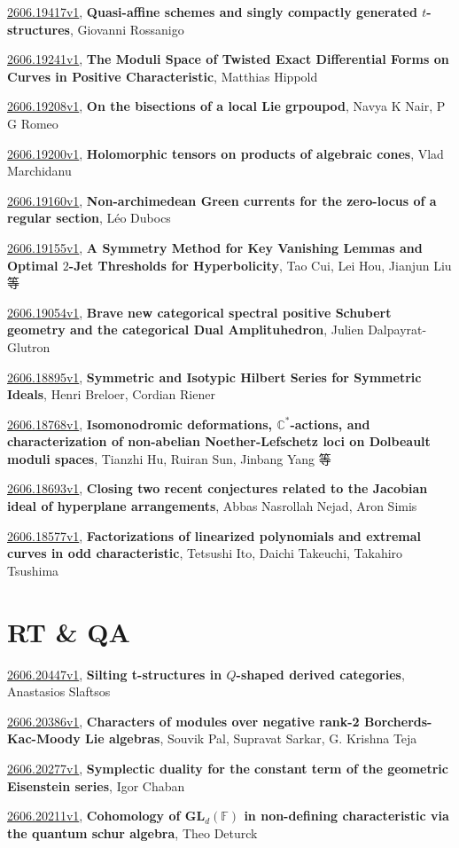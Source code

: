 \documentclass[9pt, a4paper]{article}
\theoremstyle{plain}
\theoremstyle{definition}
\theoremstyle{remark}
\newcommand{\arxiv}[3]{\href{https://arxiv.org/abs/#1}{#1}, \textbf{\textcolor{arxivblue}{#2}}, #3}
\begin{document}
\arxiv{2606.19417v1}{Quasi-affine schemes and singly compactly generated $t$-structures}{Giovanni Rossanigo}

\arxiv{2606.19241v1}{The Moduli Space of Twisted Exact Differential Forms on Curves in Positive Characteristic}{Matthias Hippold}

\arxiv{2606.19208v1}{On the bisections of a local Lie grpoupod}{Navya K Nair, P G Romeo}

\arxiv{2606.19200v1}{Holomorphic tensors on products of algebraic cones}{Vlad Marchidanu}

\arxiv{2606.19160v1}{Non-archimedean Green currents for the zero-locus of a regular section}{Léo Dubocs}

\arxiv{2606.19155v1}{A Symmetry Method for Key Vanishing Lemmas and Optimal $2$-Jet Thresholds for Hyperbolicity}{Tao Cui, Lei Hou, Jianjun Liu 等}

\arxiv{2606.19054v1}{Brave new categorical spectral positive Schubert geometry and the categorical Dual Amplituhedron}{Julien Dalpayrat-Glutron}

\arxiv{2606.18895v1}{Symmetric and Isotypic Hilbert Series for Symmetric Ideals}{Henri Breloer, Cordian Riener}

\arxiv{2606.18768v1}{Isomonodromic deformations, $\mathbb C^*$-actions, and characterization of non-abelian Noether-Lefschetz loci on Dolbeault moduli spaces}{Tianzhi Hu, Ruiran Sun, Jinbang Yang 等}

\arxiv{2606.18693v1}{Closing two recent conjectures related to the Jacobian ideal of hyperplane arrangements}{Abbas Nasrollah Nejad, Aron Simis}

\arxiv{2606.18577v1}{Factorizations of linearized polynomials and extremal curves in odd characteristic}{Tetsushi Ito, Daichi Takeuchi, Takahiro Tsushima}


\section{RT \& QA}
\arxiv{2606.20447v1}{Silting t-structures in $Q$-shaped derived categories}{Anastasios Slaftsos}

\arxiv{2606.20386v1}{Characters of modules over negative rank-2 Borcherds-Kac-Moody Lie algebras}{Souvik Pal, Supravat Sarkar, G. Krishna Teja}

\arxiv{2606.20277v1}{Symplectic duality for the constant term of the geometric Eisenstein series}{Igor Chaban}

\arxiv{2606.20211v1}{Cohomology of $\mathbf{GL}_d(\mathbb{F})$ in non-defining characteristic via the quantum schur algebra}{Theo Deturck}
\end{document}
